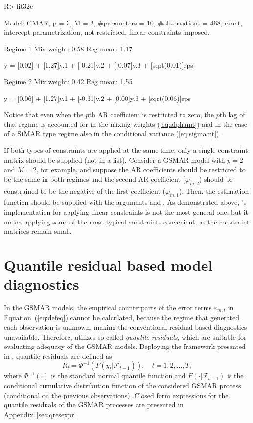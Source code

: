 \documentclass[nojss]{jss} %
\begin{document}
\begin{CodeChunk}
\begin{CodeInput}
R> fit32c
\end{CodeInput}
\begin{CodeOutput}
Model:
 GMAR, p = 3, M = 2, #parameters = 10, #observations = 468,
 exact, intercept parametrization, not restricted, linear constraints imposed.

Regime 1
Mix weight: 0.58
Reg mean: 1.17

y = [0.02] + [1.27]y.1 + [-0.21]y.2 + [-0.07]y.3 + [sqrt(0.01)]eps

Regime 2
Mix weight: 0.42
Reg mean: 1.55

y = [0.06] + [1.27]y.1 + [-0.31]y.2 + [0.00]y.3 + [sqrt(0.06)]eps
\end{CodeOutput}
\end{CodeChunk}
%
Notice that even when the $p$th AR coefficient is restricted to zero, the $p$th lag of that regime is accounted for in the mixing weights (\ref{eq:alphamt}) and in the case of a StMAR type regime also in the conditional variance (\ref{eq:sigmamt}).

If both types of constraints are applied at the same time, only a single constraint matrix should be supplied (not in a list). Consider a GSMAR model with $p=2$ and $M=2$, for example, and suppose the AR coefficients should be restricted to be the same in both regimes and the second AR coefficient ($\varphi_{m,2}$) should be constrained to be the negative of the first coefficient ($\varphi_{m,1}$). Then, the estimation function should be supplied with the arguments  and . As demonstrated above, 's implementation for applying linear constraints is not the most general one, but it makes applying some of the most typical constraints convenient, as the constraint matrices remain small.


\section{Quantile residual based model diagnostics}\label{sec:qres}
In the GSMAR models, the empirical counterparts of the error terms $\varepsilon_{m,t}$ in Equation~(\ref{eq:defeq}) cannot be calculated, because the regime that generated each observation is unknown, making the conventional residual based diagnostics unavailable. Therefore,  utilizes so called \emph{quantile residuals}, which are suitable for evaluating adequacy of the GSMAR models. Deploying the framework presented in \cite{Kalliovirta:2012}, quantile residuals are defined as
%
\begin{equation}\label{eq:qres}
R_t=\Phi^{-1}(F(y_t|\mathcal{F}_{t-1})), \quad t=1,2,...,T,
\end{equation}
%
where $\Phi^{-1}(\cdot)$ is the standard normal quantile function and $F(\cdot|\mathcal{F}_{t-1})$ is the conditional cumulative distribution function of the considered GSMAR process (conditional on the previous observations). Closed form expressions for the quantile residuals of the GSMAR processes are presented in Appendix~\ref{sec:qresexpr}.
%
\end{document}
